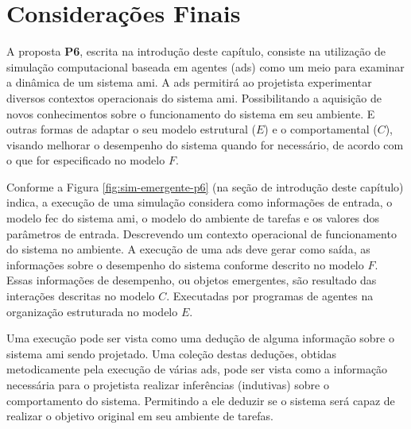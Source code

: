 \section{Considerações Finais}

    A proposta \textbf{P6}, escrita na introdução deste capítulo, consiste na utilização de simulação computacional baseada em agentes (\acrshort{ads}) como um meio para examinar a dinâmica de um sistema \acrshort{ami}. A \acrshort{ads} permitirá ao projetista experimentar diversos contextos operacionais do sistema \acrshort{ami}. Possibilitando a aquisição de novos conhecimentos sobre o funcionamento do sistema em seu ambiente. E outras formas de adaptar o seu modelo estrutural ($E$) e o comportamental ($C$),  visando melhorar o desempenho do sistema quando for necessário, de acordo com o que for especificado no modelo $F$.
    
    Conforme a Figura \ref{fig:sim-emergente-p6} (na seção de introdução deste capítulo) indica, a execução de uma simulação considera como informações de entrada, o modelo \acrshort{fec} do sistema \acrshort{ami}, o modelo do ambiente de tarefas e os valores dos parâmetros de entrada. Descrevendo um contexto operacional de funcionamento do sistema no ambiente. A execução de uma \acrshort{ads} deve gerar como saída, as informações sobre o desempenho do sistema conforme descrito no modelo $F$. Essas informações de desempenho, ou objetos emergentes, são resultado das interações descritas no modelo $C$. Executadas por programas de agentes na organização estruturada no modelo $E$. 
    
    Uma execução pode ser vista como uma dedução de alguma informação sobre o sistema \acrshort{ami} sendo projetado. Uma coleção destas deduções, obtidas metodicamente pela execução de várias \acrshort{ads}, pode ser vista como a informação necessária para o projetista realizar inferências (indutivas) sobre o comportamento do sistema. Permitindo a ele deduzir se o sistema será capaz de realizar o objetivo original em seu ambiente de tarefas.
    